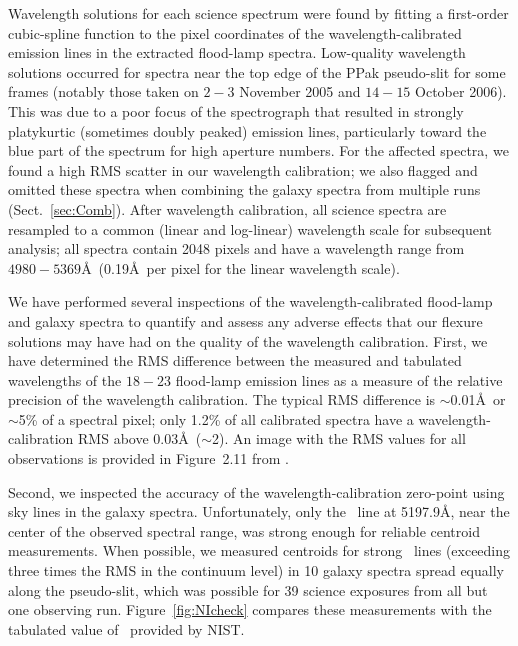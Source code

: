 \documentclass[traditabstract]{aa} %
\begin{document}
Wavelength solutions for each science spectrum were found by fitting a
first-order cubic-spline function to the pixel coordinates of the
wavelength-calibrated emission lines in the extracted flood-lamp spectra.
Low-quality wavelength solutions occurred for spectra near the top edge of the
PPak pseudo-slit for some frames (notably those taken on $2-3$ November 2005 and
$14-15$ October 2006).  This was due to a poor focus of the spectrograph that
resulted in strongly platykurtic (sometimes doubly peaked) emission lines,
particularly toward the blue part of the spectrum for high aperture numbers. For
the affected spectra, we found a high RMS scatter in our wavelength calibration;
we also flagged and omitted these spectra when combining the galaxy spectra from
multiple runs (Sect.~\ref{sec:Comb}).  After wavelength calibration, all
science spectra are resampled to a common (linear and log-linear) wavelength
scale for subsequent analysis; all spectra contain 2048 pixels and have a
wavelength range from $4980-5369$\AA\ (0.19\AA\ per pixel for the linear
wavelength scale).

We have performed several inspections of the wavelength-calibrated flood-lamp
and galaxy spectra to quantify and assess any adverse effects that our flexure
solutions may have had on the quality of the wavelength calibration.  First, we
have determined the RMS difference between the measured and tabulated
wavelengths of the $18-23$ flood-lamp emission lines as a measure of the
relative precision of the wavelength calibration.  The typical RMS difference is
$\sim$0.01\AA\ or $\sim$5\% of a spectral pixel; only 1.2\% of all calibrated
spectra have a wavelength-calibration RMS above 0.03\AA\ ($\sim$2\kms).  An
image with the RMS values for all observations is provided in Figure~2.11 from
\citet{martinsson2011}.

Second, we inspected the accuracy of the wavelength-calibration zero-point using
sky lines in the galaxy spectra.  Unfortunately, only the \none\ line at
5197.9\AA, near the center of the observed spectral range, was strong enough for
reliable centroid measurements.  When possible, we measured centroids for strong
\none\ lines (exceeding three times the RMS in the continuum level) in 10 galaxy
spectra spread equally along the pseudo-slit, which was possible for 39 science
exposures from all but one observing run. Figure~\ref{fig:NIcheck} compares
these measurements with the tabulated value of \none\ provided by NIST.
\end{document}
